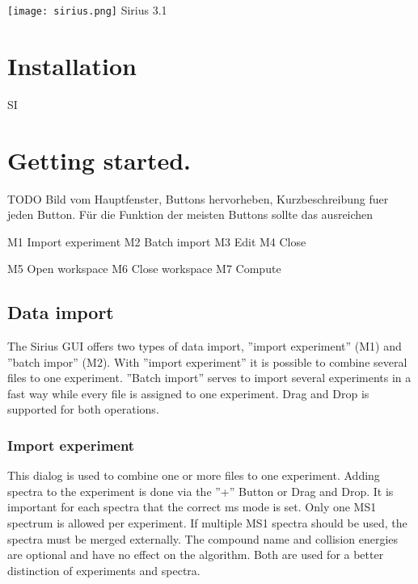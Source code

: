 \documentclass[a4paper,11pt]{article}
\begin{document}
\begin{center}
	\texttt{[image: sirius.png]}
	Sirius 3.1
\end{center}
 
 \tableofcontents
 
 \newpage
  
 \section{Installation}
 
SI
 
 \section{Getting started.}
 
 TODO Bild vom Hauptfenster, Buttons hervorheben, Kurzbeschreibung fuer jeden Button. Für die Funktion der meisten Buttons sollte das ausreichen
 
 M1 Import experiment
 M2 Batch import
 M3 Edit
 M4 Close
 
 M5 Open workspace
 M6 Close workspace
 M7 Compute 
 
 \subsection{Data import}
 
 The Sirius GUI offers two types of data import, ''import experiment'' (M1) and ''batch impor'' (M2). 
 With ''import experiment'' it is possible to combine  several files to one experiment. 
 ''Batch import'' serves to import several experiments in a fast way while every file is assigned to one experiment. 
 Drag and Drop is supported for both operations.
 
 \subsubsection{Import experiment}
 
 This dialog is used to combine one or more files to one experiment. Adding spectra to the experiment is done via 
 the ''+'' Button or Drag and Drop. It is important for each spectra that the correct ms mode is set.  
 Only one MS1 spectrum is allowed per experiment. If multiple MS1 spectra should be used, the spectra must be merged externally.  
 The compound name and collision energies are optional and have no effect on the algorithm. 
 Both are used  for a better distinction of experiments and spectra. 
 
\end{document}
